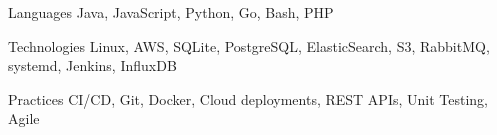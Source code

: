 

\begin{cvskills}

  \cvskill
    {Languages} %
    {Java, JavaScript, Python, Go, Bash, PHP} %

  \cvskill
    {Technologies} %
    {Linux, AWS, SQLite, PostgreSQL, ElasticSearch, S3, RabbitMQ, systemd, Jenkins, InfluxDB} %
    
  \cvskill
    {Practices}
    {CI/CD, Git, Docker, Cloud deployments, REST APIs, Unit Testing, Agile}


\end{cvskills}
